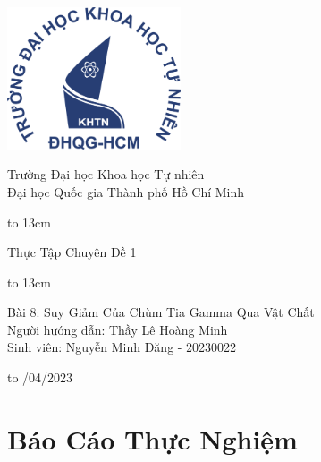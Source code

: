 \documentclass{article}
\begin{document}
\onehalfspacing
{
   \setlength{\topmargin}{-0.5cm}
\begin{titlepage}
  \begin{center}
    \centerline{\includegraphics[height=42mm]{logo}}

    
   \vspace{1cm}

        {\large Trường Đại học Khoa học Tự nhiên}\\[1em]
        {\large Đại học Quốc gia Thành phố Hồ Chí Minh}
    
        \vspace{1.2cm}
    \centerline{\hbox to 13cm{\hrulefill}}
    \vspace{0.3cm}
    \Large  {{Thực Tập Chuyên Đề 1 }}
    \centerline{\hbox to 13cm{\hrulefill}}
    
    \vspace{1.2cm}
    \Large {Bài 8: Suy Giảm Của Chùm Tia Gamma Qua Vật Chất}\\ 
   
   \vspace{3cm}
            \large Người hướng dẫn: Thầy Lê Hoàng Minh \\ 
            \large Sinh viên: Nguyễn Minh Đăng - 20230022
    
    \vspace{4cm}
    

    
    \hbox to \textwidth{\hrulefill}
    \vspace{0.2cm}
    {/04/2023}
    
  \end{center}
\end{titlepage}
}

\newpage
\clearpage\thispagestyle{empty}\addtocounter{page}{-1} 
\clearpage
\mbox{}
\newpage
\section*{\centering Báo Cáo Thực Nghiệm}
\vspace{1cm}
\end{document}
